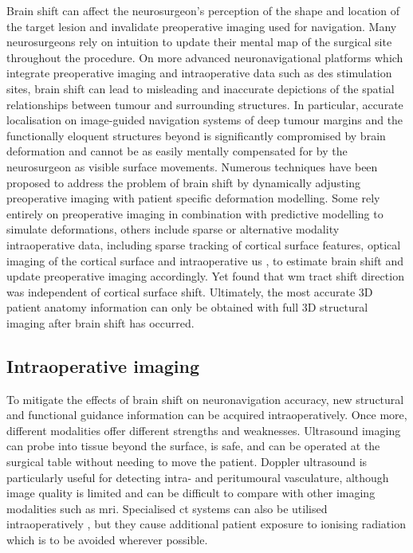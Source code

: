 Brain shift can affect the neurosurgeon's perception of the shape and location of the target lesion and invalidate preoperative imaging used for navigation\autocite{Nimsky2000}.
Many neurosurgeons rely on intuition to update their mental map of the surgical site throughout the procedure.
On more advanced neuronavigational platforms which integrate preoperative imaging and intraoperative data such as \gls{des} stimulation sites, brain shift can lead to misleading and inaccurate depictions of the spatial relationships between tumour and surrounding structures.
In particular, accurate localisation on image-guided navigation systems of deep tumour margins and the functionally eloquent structures beyond is significantly compromised by brain deformation and cannot be as easily mentally compensated for by the neurosurgeon as visible surface movements\autocite{Nimsky2000}.
Numerous techniques have been proposed to address the problem of brain shift\autocite{Bayer2017b} by dynamically adjusting preoperative imaging with patient specific deformation modelling.
Some rely entirely on preoperative imaging in combination with predictive modelling to simulate deformations, others include sparse or alternative modality intraoperative data, including sparse tracking of cortical surface features\autocite{Luo2019}, optical imaging of the cortical surface\autocite{Skrinjar2002,Audette2005,Fan2017} and intraoperative \gls{us} \autocite{Letteboer2005,Reinertsen2007,Bucki2012,Machado2019}, to estimate brain shift and update preoperative imaging accordingly.
Yet \textcite{Yang2017a} found that \gls{wm} tract shift direction was independent of cortical surface shift.
Ultimately, the most accurate 3D patient anatomy information can only be obtained with full 3D structural imaging after brain shift has occurred.


\subsection{Intraoperative imaging}

To mitigate the effects of brain shift on neuronavigation accuracy, new structural and functional guidance information can be acquired intraoperatively.
Once more, different modalities offer different strengths and weaknesses.
Ultrasound imaging can probe into tissue beyond the surface, is safe, and can be operated at the surgical table without needing to move the patient\autocite{Elmesallamy2019,Eljamel2016}.
Doppler ultrasound is particularly useful for detecting intra- and peritumoural vasculature\autocite{Steno2016}, although image quality is limited and can be difficult to compare with other imaging modalities such as \gls{mri}\autocite{Eljamel2016}.
Specialised \gls{ct} systems can also be utilised intraoperatively \autocite{Bayer2018}, but they cause additional patient exposure to ionising radiation which is to be avoided wherever possible.

